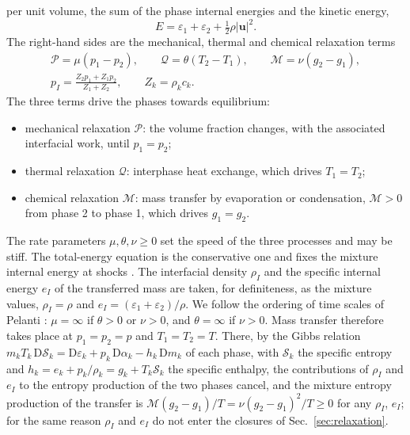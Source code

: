 \documentclass[a4paper,fleqn]{cas-sc}
\begin{document}
per unit volume, the sum of the phase internal energies and the kinetic energy,
\begin{equation}
E=\varepsilon_1+\varepsilon_2+\tfrac12\rho|\mathbf u|^2 .
\label{eq:energy}
\end{equation}
The right-hand sides are the mechanical, thermal and chemical relaxation terms
\begin{equation}
\begin{gathered}
\mathcal P=\mu(p_1-p_2),\qquad \mathcal Q=\theta(T_2-T_1),\qquad \mathcal M=\nu(g_2-g_1),\\
p_I=\frac{Z_2p_1+Z_1p_2}{Z_1+Z_2},\qquad Z_k=\rho_kc_k .
\end{gathered}
\label{eq:sources}
\end{equation}
The three terms drive the phases towards equilibrium:
\begin{itemize}
\item mechanical relaxation $\mathcal P$: the volume fraction changes, with the associated interfacial work, until $p_1=p_2$;
\item thermal relaxation $\mathcal Q$: interphase heat exchange, which drives $T_1=T_2$;
\item chemical relaxation $\mathcal M$: mass transfer by evaporation or condensation, $\mathcal M>0$ from phase 2 to
phase 1, which drives $g_1=g_2$.
\end{itemize}
The rate parameters $\mu,\theta,\nu\ge0$ set the speed of the three processes and may be stiff. The total-energy equation is the conservative one and fixes the mixture internal energy at shocks \cite{SPB2009}. The interfacial density $\rho_I$ and the specific internal energy $e_I$ of the
transferred mass are taken, for definiteness, as the mixture values, $\rho_I=\rho$ and $e_I=(\varepsilon_1+\varepsilon_2)/\rho$. We follow the
ordering of time scales of Pelanti \cite{Pelanti2022}: $\mu=\infty$ if $\theta>0$ or $\nu>0$, and $\theta=\infty$ if $\nu>0$. Mass transfer
therefore takes place at $p_1=p_2=p$ and $T_1=T_2=T$. There, by the Gibbs relation
$m_kT_k\,\mathrm D\mathcal S_k=\mathrm D\varepsilon_k+p_k\,\mathrm D\alpha_k-h_k\,\mathrm Dm_k$ of each phase, with $\mathcal S_k$ the
specific entropy and $h_k=e_k+p_k/\rho_k=g_k+T_k\mathcal S_k$ the specific enthalpy, the contributions of $\rho_I$ and $e_I$ to the entropy
production of the two phases cancel, and the mixture entropy production of the transfer is
$\mathcal M(g_2-g_1)/T=\nu(g_2-g_1)^2/T\ge0$ for any $\rho_I$, $e_I$; for the same reason $\rho_I$ and $e_I$ do not enter the closures of
Sec.~\ref{sec:relaxation}.
\end{document}
